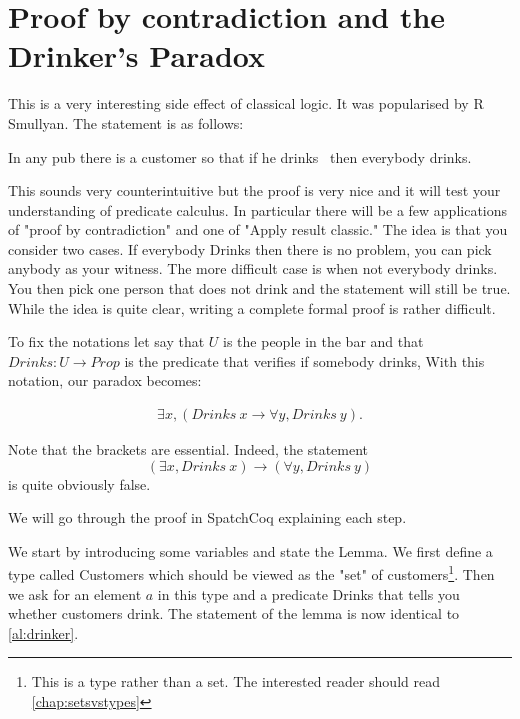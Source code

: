 \section{Proof by contradiction and the Drinker's Paradox}\label{sec:drinker}


This is a very interesting side effect of classical logic. It was popularised by R Smullyan. The statement is as follows:

In any pub there is a customer so that if he drinks \ then everybody drinks. 


This sounds very counterintuitive but the proof is very nice and it will test your understanding of predicate calculus. In particular there will be a few applications of "proof by contradiction" and one of "Apply result classic." The idea is that you consider two cases. If everybody Drinks  then there is no problem, you can pick anybody as your witness. The more difficult case is when not everybody drinks. You then pick one person that does not drink and the statement will still be true. While the idea is quite clear, writing a complete formal proof is rather difficult. 


To fix the notations let say that $U$ is the people in the bar and that $Drinks: U \rightarrow Prop$ is the  predicate that verifies if somebody drinks, With this notation, our paradox becomes:

\begin{align}\label{al:drinker}\exists x,  (Drinks \ x \rightarrow \forall y, Drinks \ y).\end{align}

Note that the brackets are essential. Indeed, the statement 
$$(\exists x,  Drinks\  x) \rightarrow (\forall y, Drinks \  y)$$
is quite obviously false.

We will go through the proof in SpatchCoq explaining each step.

We start by introducing some variables and state the Lemma. We  first define a type called Customers which should be viewed as the "set" of customers\footnote{This is a type rather than a set. The interested reader should read \ref{chap:setsvstypes}}. Then we ask for an element $a$ in this type and a predicate Drinks that tells you whether customers drink. The statement of the lemma is now identical to \ref{al:drinker}.




